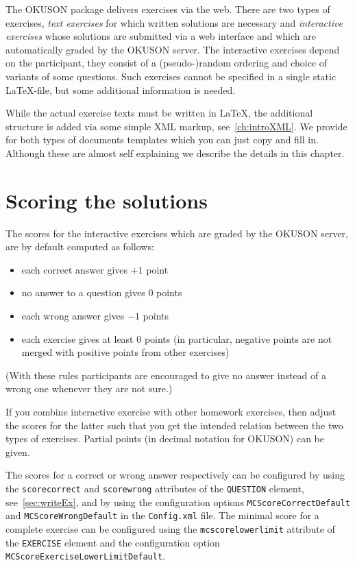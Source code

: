 \documentclass[12pt,openany,a4paper]{book}
\newcommand{\OKUSON}{\textsf{OKUSON}}
\begin{document}
The {\OKUSON} package delivers exercises via the web. There are two types of
exercises, \emph{text  exercises} for which written  solutions are necessary
and \emph{interactive  exercises} whose  solutions are  submitted via  a web
interface  and  which are  automatically  graded  by the  {\OKUSON}  server.
The  interactive exercises  depend on  the  participant, they  consist of  a
(pseudo-)random  ordering and  choice of  variants of  some questions.  Such
exercises  cannot be  specified in  a  single static  \LaTeX-file, but  some
additional information is needed.

While the actual exercise texts must be written in \LaTeX, the additional
structure is added via some simple XML markup, see~\ref{ch:introXML}.
We provide for both types of documents templates which you can just copy and
fill in. Although these are almost self explaining we describe the details in
this chapter.

\section{Scoring the solutions}

The scores for the interactive exercises which are graded by the {\OKUSON}
server, are by default computed as follows:

\begin{itemize}
\item each correct answer gives $+1$ point
\item no answer to a question gives $0$ points
\item each wrong answer gives $-1$ points
\item each exercise gives at least $0$ points (in particular, negative points 
are not merged with positive points from other exercises)
\end{itemize}

(With these rules participants are encouraged to give no answer instead of a
wrong one whenever they are not sure.)

If you combine interactive exercise with other homework exercises, then
adjust the scores for the latter such that you get the intended relation
between the two types of exercises. Partial points (in decimal notation for 
{\OKUSON}) can be given. 

The scores for a correct or wrong answer respectively can be configured
by using the \texttt{scorecorrect} and \texttt{scorewrong} attributes of
the \texttt{QUESTION} element, see~\ref{sec:writeEx}, and by using the
configuration options \texttt{MCScoreCorrectDefault} and 
\texttt{MCScoreWrongDefault} in the \texttt{Config.xml} file. The 
minimal score for a complete exercise can be configured using the
\texttt{mcscorelowerlimit} attribute of the \texttt{EXERCISE} element 
and the configuration option \texttt{MCScoreExerciseLowerLimitDefault}.
\end{document}
